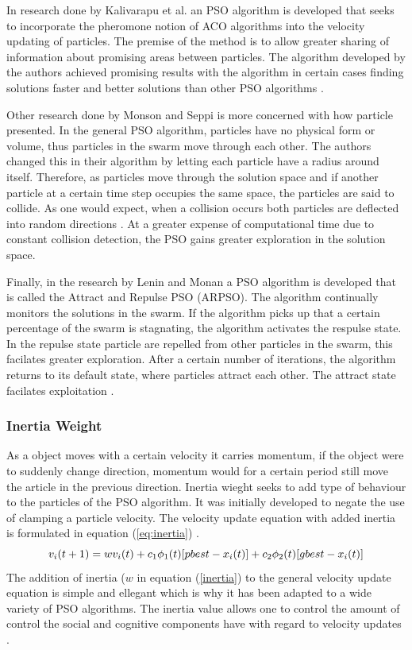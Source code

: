 In research done by Kalivarapu et al. \cite{PSOPheromones} an PSO algorithm is developed that seeks to incorporate the pheromone notion of ACO algorithms into the velocity updating of particles. The premise of the method is to allow greater sharing of information about promising areas between particles. The algorithm developed by the authors achieved promising results with the algorithm in certain cases finding solutions faster and better solutions than other PSO algorithms \cite{PSOPheromones}. 

Other research done by Monson and Seppi \cite{adaptPSO} is more concerned with how particle presented. In the general PSO algorithm, particles have no physical form or volume, thus particles in the swarm move through each other. The authors changed this in their algorithm by letting each particle have a radius around itself. Therefore, as particles move through the solution space and if another particle at a certain time step occupies the same space, the particles are said to collide. As one would expect, when a collision occurs both particles are deflected into random directions \cite{adaptPSO}. At a greater expense of computational time due to constant collision detection, the PSO gains greater exploration in the solution space. 

Finally, in the research by Lenin and Monan a PSO algorithm is developed that is called the Attract and Repulse PSO (ARPSO). The algorithm continually monitors the solutions in the swarm. If the algorithm picks up that a certain percentage of the swarm is stagnating, the algorithm activates the respulse state. In the repulse state particle are repelled from other particles in the swarm, this facilates greater exploration. After a certain number of iterations, the algorithm returns to its default state, where particles attract each other. The attract state facilates exploitation \cite{PSOAttractRepulse}.
\subsubsection{Inertia Weight}
As a object moves with a certain velocity it carries momentum, if the object were to suddenly change direction, momentum would for a certain period still move the article in the previous direction. Inertia wieght seeks to add type of behaviour to the particles of the PSO algorithm. It was initially developed to negate the use of clamping a particle velocity. The velocity update equation with added inertia is formulated in equation (\ref{eq:inertia}) \cite{FundamentalSwarm}.
\begin{equation}
v_i(t+1) = wv_i(t) + c_1\phi_{1}(t)[pbest - x_i(t)] + c_2\phi_{2}(t)[gbest - x_i(t)]\label{eq:inertia}\\
\end{equation}
The addition of inertia ($w$ in equation (\ref{inertia}) to the general velocity update equation is simple and ellegant which is why it has been adapted to a wide variety of PSO algorithms. The inertia value allows one to control the amount of control the social and cognitive components have with regard to velocity updates \cite{FundamentalSwarm}. 

